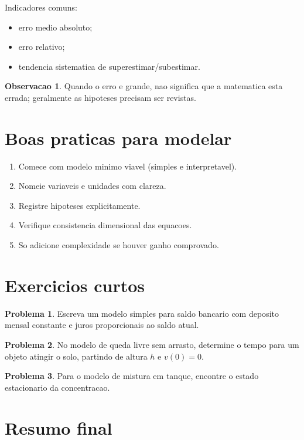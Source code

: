 \documentclass[12pt,a4paper,oneside]{book}
\theoremstyle{definition}
\newtheorem{remark}[definition]{Observacao}
\newtheorem{problem}{Problema}
\begin{document}
Indicadores comuns:
\begin{itemize}
    \item erro medio absoluto;
    \item erro relativo;
    \item tendencia sistematica de superestimar/subestimar.
\end{itemize}

\begin{remark}
Quando o erro e grande, nao significa que a matematica esta errada; geralmente as hipoteses precisam ser revistas.
\end{remark}

\section{Boas praticas para modelar}

\begin{enumerate}
    \item Comece com modelo minimo viavel (simples e interpretavel).
    \item Nomeie variaveis e unidades com clareza.
    \item Registre hipoteses explicitamente.
    \item Verifique consistencia dimensional das equacoes.
    \item So adicione complexidade se houver ganho comprovado.
\end{enumerate}

\section{Exercicios curtos}

\begin{problem}
Escreva um modelo simples para saldo bancario com deposito mensal constante e juros proporcionais ao saldo atual.
\end{problem}

\begin{problem}
No modelo de queda livre sem arrasto, determine o tempo para um objeto atingir o solo, partindo de altura $h$ e $v(0)=0$.
\end{problem}

\begin{problem}
Para o modelo de mistura em tanque, encontre o estado estacionario da concentracao.
\end{problem}

\section{Resumo final}
\end{document}
